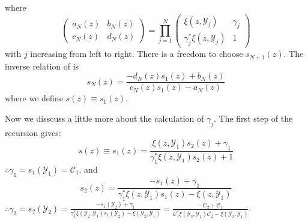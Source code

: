 \documentclass[
	preprint,%
	aps,
	prb,
	showpacs,	
	amsmath, amssymb]{revtex4-2}
\newcommand{\Y}{ {\mathcal{Y}} }
\newcommand{\C}{ {\mathcal{C}} }
\begin{document}
where
\begin{equation}\label{eq:factor-matrix-schur}
	\left(
		\begin{matrix}
			a_N(z) & b_N(z) \\
			c_N(z) & d_N(z)
		\end{matrix}
	\right)
	= \prod_{j=1}^{N}
	\left(
		\begin{matrix}
			\xi(z, \Y_j)            & \gamma_j \\
			\gamma_j^* \xi(z, \Y_j) & 1
		\end{matrix}
	\right)
\end{equation}
with $j$ increasing from left to right. 
There is a freedom to choose $s_{N+1}(z)$. 
The inverse relation of \label{eq:recursive-s} is
\begin{equation}\label{eq:inv-recursive-s}
	s_N(z) 
	= \frac{-d_N(z) s_1(z) + b_N(z)}{c_N(z) s_1(z) - a_N(z)}
\end{equation}
where we define $s(z) \equiv s_1(z)$.

Now we disscuss a little more about the calculation of $\gamma_j$.
The first step of the recursion gives:
\begin{equation}
	s(z)\equiv s_1(z) 
	= \frac{\xi(z, \Y_1) s_{2}(z) + \gamma_1 }
		{\gamma_1^* \xi(z, \Y_1) s_{2}(z) + 1}
\end{equation}
$\therefore  \gamma_1 = s_1(\Y_1) = \C_1$. and 
\begin{equation}
	s_2(z) 
	= \frac{-s_1(z) + \gamma_1}
		{\gamma_1^* \xi(z, \Y_1) s_1(z) - \xi(z, \Y_1) }
\end{equation}
$\therefore \gamma_2 = s_2(\Y_2) 
= \frac{-s_1(\Y_2) + \gamma_1} 
	{\gamma_1^* \xi(\Y_2, \Y_1) s_1(\Y_2) - \xi(\Y_2, \Y_1) }
= \frac{-C_2 + \C_1}
	{\C_1^* \xi(\Y_2, \Y_1) \C_2 - \xi(\Y_2, \Y_1) }$.
\end{document}
